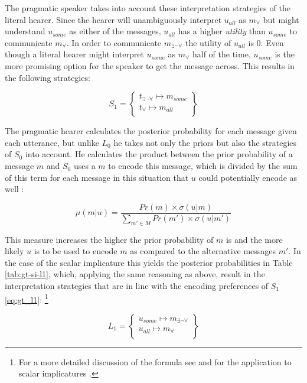 The pragmatic speaker takes into account these interpretation strategies of the literal hearer. Since the hearer will unambiguously interpret $u_{\textit{all}}$ as $m_{\forall}$ but might understand $u_{\textit{some}}$ as either of the messages, $u_{\textit{all}}$ has a higher \textit{utility} than $u_{\textit{some}}$ to communicate $m_{\forall}$. In order to communicate $m_{\exists\neg\forall}$ the utility of $u_{\textit{all}}$ is 0. Even though a literal hearer might interpret $u_{\textit{some}}$ as $m_{\forall}$ half of the time, $u_{\textit{some}}$ is the more promising option for the speaker to get the message across. This results in the following strategies:

\begin{equation}
 S_1 = \begin{Bmatrix} t_{\exists\neg\forall} \mapsto m_{\textit{some}}\\
        t_{\forall} \mapsto m_{\textit{all}}\\
       \end{Bmatrix}
\end{equation}

The pragmatic hearer calculates the posterior probability for each message given each utterance, but unlike $L_0$ he takes not only the priors but also the strategies of $S_0$ into account. He calculates the product between the prior probability of a message $m$ and $S_0$ uses a $m$ to encode this message, which is divided by the sum of this term for each message in this situation that $u$ could potentially encode as well \citep[27]{franke2009}:

\begin{equation}
\displaystyle \mu(m|u) = \frac{Pr(m) \times \sigma (u|m)}{\sum_{m'\in M} Pr(m') \times \sigma(u|m')} %
\end{equation}

This measure increases the higher the prior probability of $m$ is and the more likely $u$ is to be used to encode $m$ as compared to the alternative messages $m'$. In the case of the scalar implicature this yields the posterior probabilities in Table \ref{tab:gt-si-l1}, which, applying the same reasoning as above, result in the interpretation strategies that are in line with the encoding preferences of $S_1$ \ref{eq:gt_l1}:%
%
\footnote{For a more detailed discussion of the formula see \citet[26--27]{franke2009} and for the application to scalar implicatures \citep[60]{franke2009}.}\afterfn%
%

\begin{equation}
L_1 = \begin{Bmatrix} u_{\textit{some}} \mapsto m_{\exists\neg\forall} \\
        u_{\textit{all}} \mapsto m_{\forall}\\
       \end{Bmatrix}\label{eq:gt_l1}
\end{equation}

